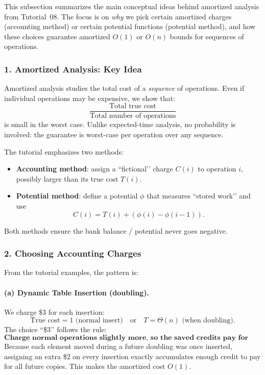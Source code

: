 \documentclass[9pt]{extarticle}
\begin{document}
This subsection summarizes the main conceptual ideas behind amortized analysis
from Tutorial~08.  The focus is on \emph{why} we pick certain amortized charges
(accounting method) or certain potential functions (potential method), and how
these choices guarantee amortized $O(1)$ or $O(n)$ bounds for sequences of
operations.

\subsubsection*{1. Amortized Analysis: Key Idea}
Amortized analysis studies the total cost of a \emph{sequence} of operations.
Even if individual operations may be expensive, we show that:
\[
\frac{\text{Total true cost}}{\text{Total number of operations}}
\]
is small in the worst case.  
Unlike expected-time analysis, no probability is involved: the guarantee is
worst-case per operation over any sequence.

The tutorial emphasizes two methods:
\begin{itemize}
    \item \textbf{Accounting method}: assign a “fictional’’ charge $C(i)$ to
          operation $i$, possibly larger than its true cost $T(i)$.
    \item \textbf{Potential method}: define a potential $\phi$ that measures
          “stored work’’ and use
          \[
          C(i) = T(i) + (\phi(i) - \phi(i-1)).
          \]
\end{itemize}
Both methods ensure the bank balance / potential never goes negative.

\subsubsection*{2. Choosing Accounting Charges}
From the tutorial examples, the pattern is:

\paragraph{(a) Dynamic Table Insertion (doubling).}
We charge \$3 for each insertion:
\[
\text{True cost}=1 \text{ (normal insert)} \quad\text{or}\quad T=\Theta(n)
\text{ (when doubling)}.
\]
The choice “\$3’’ follows the rule:
\[
\textbf{Charge normal operations slightly more, so the saved credits pay for rare expensive ones.}
\]
Because each element moved during a future doubling was once inserted, assigning
an extra \$2 on every insertion exactly accumulates enough credit to pay for all
future copies.  
This makes the amortized cost $O(1)$.
\end{document}
